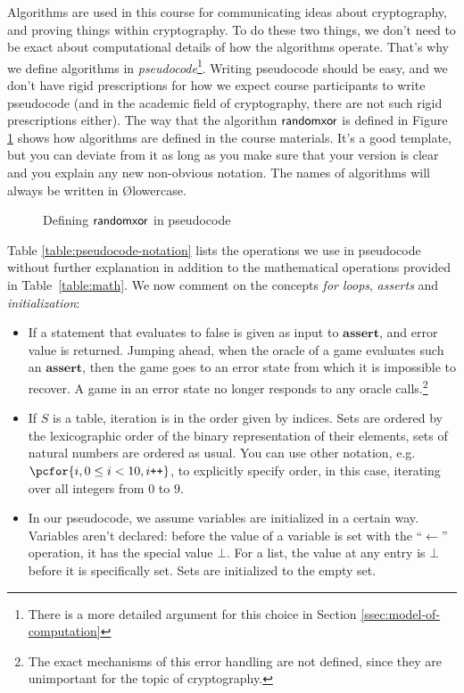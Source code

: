 Algorithms are used in this course for communicating ideas about cryptography, and proving things within cryptography. To do these two things, we don't need to be exact about computational details of how the algorithms operate. That's why we define algorithms in \emph{pseudocode}\footnote{There is a more detailed argument for this choice in Section \ref{ssec:model-of-computation}}. Writing pseudocode should be easy, and we don't have rigid prescriptions for how we expect course participants to write pseudocode (and in the academic field of cryptography, there are not such rigid prescriptions either). The way that the algorithm $\mathsf{randomxor}$ is defined in Figure \ref{example-pseudocode} shows how algorithms are defined in the course materials. It's a good template, but you can deviate from it as long as you make sure that your version is clear and you explain any new non-obvious notation. The names of algorithms will always be written in \O{lowercase}.

\begin{figure}
  \begin{center}
  \end{center}
  \caption{Defining $\mathsf{randomxor}$ in pseudocode}\label{example-pseudocode}
\end{figure}


Table \ref{table:pseudocode-notation} lists the operations we use in pseudocode without further explanation in addition to the mathematical operations provided in Table~\ref{table:math}. We now comment on the concepts \emph{for loops}, \emph{asserts} and \emph{initialization}:
\begin{itemize}
  \item If a statement that evaluates to false is given as input to $\mathbf{assert}$, and error value is returned. Jumping ahead, when the oracle of a game evaluates such an $\mathbf{assert}$, then the game goes to an error state from which it is impossible to recover. A game in an error state no longer responds to any oracle calls.\footnote{The exact mechanisms of this error handling are not defined, since they are unimportant for the topic of cryptography.}
  \item If $S$ is a table, iteration is in the order given by indices. Sets are ordered by the lexicographic order of the binary representation of their elements, sets of natural numbers are ordered as usual. You can use other notation, e.g. $\pcfor \{i, 0\leq i<10, i\texttt{++}\}$, to explicitly specify order, in this case, iterating over all integers from $0$ to $9$.
  \item  In our pseudocode, we assume variables are initialized in a certain way. Variables aren't declared: before the value of a variable is set with the ``$\gets$'' operation, it has the special value $\bot$. For a list, the value at any entry is $\bot$ before it is specifically set. Sets are initialized to the empty set.
\end{itemize}

